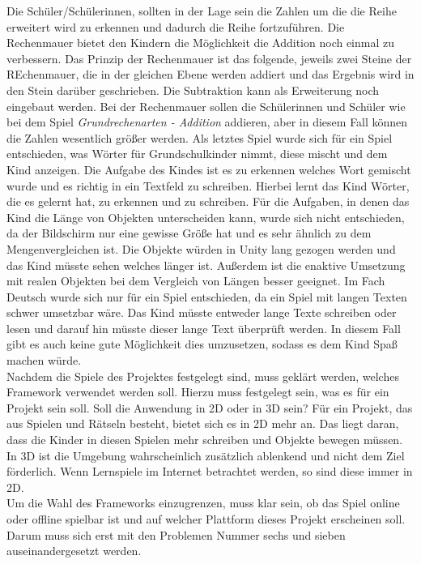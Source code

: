Die Schüler/Schülerinnen, sollten in der Lage sein die Zahlen um die die Reihe erweitert wird zu erkennen und dadurch die Reihe fortzuführen. Die Rechenmauer bietet den Kindern die Möglichkeit die Addition noch einmal zu verbessern. Das Prinzip der Rechenmauer ist das folgende, jeweils zwei Steine der REchenmauer, die in der gleichen Ebene werden addiert und das Ergebnis wird in den Stein darüber geschrieben. Die Subtraktion kann als Erweiterung noch eingebaut werden. Bei der Rechenmauer sollen die Schülerinnen und Schüler wie bei dem Spiel \textit{Grundrechenarten - Addition} addieren, aber in diesem Fall können die Zahlen wesentlich größer werden. Als letztes Spiel wurde sich für ein Spiel entschieden, was Wörter für Grundschulkinder nimmt, diese mischt und dem Kind anzeigen. Die Aufgabe des Kindes ist es zu erkennen welches Wort gemischt wurde und es richtig in ein Textfeld zu schreiben. Hierbei lernt das Kind Wörter, die es gelernt hat, zu erkennen und zu schreiben. Für die Aufgaben, in denen das Kind die Länge von Objekten unterscheiden kann, wurde sich nicht entschieden, da der Bildschirm nur eine gewisse Größe hat und es sehr ähnlich zu dem Mengenvergleichen ist. Die Objekte würden in Unity lang gezogen werden und das Kind müsste sehen welches länger ist. Außerdem ist die enaktive Umsetzung mit realen Objekten bei dem Vergleich von Längen besser geeignet. Im Fach Deutsch wurde sich nur für ein Spiel entschieden, da ein Spiel mit langen Texten schwer umsetzbar wäre. Das Kind müsste entweder lange Texte schreiben oder lesen und darauf hin müsste dieser lange Text überprüft werden. In diesem Fall gibt es auch keine gute Möglichkeit dies umzusetzen, sodass es dem Kind Spaß machen würde.
\\
Nachdem die Spiele des Projektes festgelegt sind, muss geklärt werden, welches Framework verwendet werden soll. Hierzu muss festgelegt sein, was es für ein Projekt sein soll. Soll die Anwendung in 2D oder in 3D sein? Für ein Projekt, das aus Spielen und Rätseln besteht, bietet sich es in 2D mehr an. Das liegt daran, dass die Kinder in diesen Spielen mehr schreiben und Objekte bewegen müssen. In 3D ist die Umgebung wahrscheinlich zusätzlich ablenkend und nicht dem Ziel förderlich. Wenn Lernspiele im Internet betrachtet werden, so sind diese immer in 2D.\\
Um die Wahl des Frameworks einzugrenzen, muss klar sein, ob das Spiel online oder offline spielbar ist und auf welcher Plattform dieses Projekt erscheinen soll.\\
Darum muss sich erst mit den Problemen Nummer sechs und sieben auseinandergesetzt werden.
